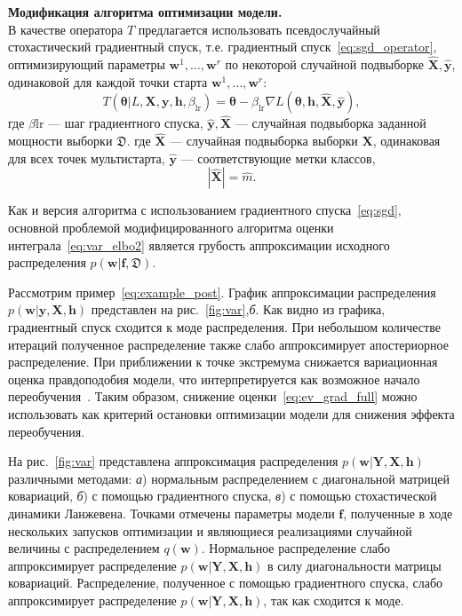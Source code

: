 \textbf{Модификация алгоритма оптимизации модели.} \\
В качестве оператора $T$ предлагается использовать псевдослучайный стохастический градиентный спуск, т.е. градиентный спуск~\eqref{eq:sgd_operator}, оптимизирующий параметры $\mathbf{w}^1,\dots,\mathbf{w}^r$ по некоторой случайной подвыборке $\hat{\mathbf{X}}, \hat{\mathbf{y}}$, одинаковой для каждой точки старта $\mathbf{w}^1,\dots,\mathbf{w}^r$:
\[
    T( \boldsymbol{\theta}| L,\mathbf{X},  \mathbf{y},  \mathbf{h}, {\beta_{\text{lr}}}) = \boldsymbol{\theta} - \beta_{\text{lr}}\nabla L(\boldsymbol{\theta},   \mathbf{h},  \hat{\mathbf{X}}, \hat{\mathbf{y}}),
\]
где $\beta{\text{lr}}$ --- шаг градиентного спуска, $\hat{\mathbf{y}}, \hat{\mathbf{X}}$ --- случайная подвыборка заданной мощности выборки $\mathfrak{D}$.
где $\hat{\mathbf{X}}$ --- случайная подвыборка выборки ${\mathbf{X}}$, одинаковая для всех точек мультистарта, $\hat{\mathbf{y}}$ --- соответствующие метки классов, $$|\hat{\mathbf{X}}| = \hat{m}.$$

Как и версия алгоритма с использованием градиентного спуска~\eqref{eq:sgd}, основной проблемой модифицированного алгоритма оценки интеграла~\eqref{eq:var_elbo2} является грубость аппроксимации исходного распределения $p(\mathbf{w}|\mathbf{f},\mathfrak{D})$.

Рассмотрим пример~\eqref{eq:example_post}.
График аппроксимации распределения $p(\mathbf{w}|\mathbf{y}, \mathbf{X}, \mathbf{h})$ представлен на рис.~\ref{fig:var},\textit{б}.
Как видно из графика, градиентный спуск сходится к моде распределения. При небольшом количестве итераций полученное распределение также слабо аппроксимирует апостериорное распределение. {При приближении к точке экстремума снижается вариационная оценка правдоподобия модели, что  интерпретируется как возможное начало переобучения~\cite{early}. Таким образом, снижение оценки~\eqref{eq:ev_grad_full} можно использовать как критерий остановки оптимизации модели для снижения эффекта переобучения.  }

На рис.~\ref{fig:var} представлена  {аппроксимация распределения $p(\mathbf{w}|\mathbf{Y}, \mathbf{X}, \mathbf{h})$ различными методами: \textit{а}) нормальным распределением с диагональной матрицей ковариаций, \textit{б}) с помощью градиентного спуска, \textit{в}) с помощью стохастической динамики Ланжевена. Точками отмечены параметры модели $\mathbf{f}$, полученные в ходе нескольких запусков оптимизации и являющиеся реализациями случайной величины с распределением $q(\mathbf{w})$. Нормальное распределение слабо аппроксимирует распределение $p(\mathbf{w}|\mathbf{Y}, \mathbf{X}, \mathbf{h})$ в силу диагональности матрицы ковариаций. Распределение, полученное с помощью градиентного спуска, слабо аппроксимирует распределение $p(\mathbf{w}|\mathbf{Y}, \mathbf{X}, \mathbf{h})$, так как сходится к моде.}





